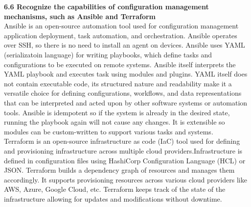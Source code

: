 \documentclass{article}
\begin{document}
\noindent\textbf{6.6 Recognize the capabilities of configuration management mechanisms, such as Ansible and Terraform}\\

Ansible is an open-source automation tool used for configuration management application deployment, task automation, and orchestration. Ansible operates over SSH, so there is no need to install an agent on devices. Ansible uses YAML (serializatoin language) for writing playbooks, which define tasks and configurations to be executed on remote systems. Ansible itself interprets the YAML playbook and executes task using modules and plugins. YAML itself does not contain executable code, its structured nature and readability make it a versatile choice for defining configurations, workflows, and data representations that can be interpreted and acted upon by other software systems or automation tools. Ansible is idempotent so if the system is already in the desired state, running the playbook again will not cause any changes. It is extensible so modules can be custom-written to support various tasks and systems.\\

	Terraform is an open-source infrastructure as code (IaC) tool used for defining and provisioning infrastructure across multiple cloud providers.Infrastructure is defined in configuration files using HashiCorp Configuration Language (HCL) or JSON. Terraform builds a dependency graph of resources and manages them accordingly. It supports provisioning resources across various cloud providers like AWS, Azure, Google Cloud, etc. Terraform keeps track of the state of the infrastructure allowing for updates and modifications without downtime.\\
  
\end{document}
